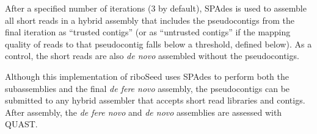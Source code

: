 \documentclass[10pt]{article}
\begin{document}
\begin{linenumbers}
After a specified number of iterations (3 by default), SPAdes is used to assemble all short reads in a hybrid assembly that includes the pseudocontigs from the final iteration as ``trusted contigs'' (or as ``untrusted contigs'' if the mapping quality of reads to that pseudocontig falls below a threshold, defined below). As a control, the short reads are also \textit{de novo} assembled without the pseudocontigs.


Although this implementation of riboSeed uses SPAdes to perform both the subassemblies and the final \textit{de fere novo} assembly, the pseudocontigs can be submitted to any hybrid assembler that accepts short read libraries and contigs. After assembly, the \textit{de fere novo} and \textit{de novo} assemblies are assessed with QUAST\cite{Gurevich2013}.

\begin{figure}[h]
  \centering
  \begin{minipage}{.6\linewidth}
    \begin{algorithm}[H]

\end{algorithm}
\end{minipage}
\end{figure}
\end{linenumbers}
\end{document}
